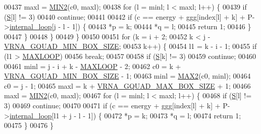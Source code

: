 \begin{DoxyCode}
00437       maxl  = \mbox{\hyperlink{group__utils_gae0b9cd0ce090bd69b951aa73e8fa4f7d}{MIN2}}(c0, maxl);
00438       \textcolor{keywordflow}{for} (l = minl; l < maxl; l++) \{
00439         \textcolor{keywordflow}{if} (\mbox{\hyperlink{group__energy__parameters__rw_gga7bf2bb363bcf5ce50d60255d256e5682af1ce01387d2348f8b858721a7db81670}{S}}[l] != 3)
00440           \textcolor{keywordflow}{continue};
00441 
00442         \textcolor{keywordflow}{if} (c == energy + ggg[index[l] + k] + P->\mbox{\hyperlink{group__energy__parameters_a2a4fb2c65023ec371c9b96573da6d2fc}{internal\_loop}}[j - l - 1]) \{
00443           *p  = k;
00444           *q  = l;
00445           \textcolor{keywordflow}{return} 1;
00446         \}
00447       \}
00448     \}
00449   \}
00450 
00451   \textcolor{keywordflow}{for} (k = i + 2;
00452        k < j - \mbox{\hyperlink{group__energy__parameters_gad7bdd880afca461f97763d79ee57a347}{VRNA\_GQUAD\_MIN\_BOX\_SIZE}};
00453        k++) \{
00454     l1 = k - i - 1;
00455     \textcolor{keywordflow}{if} (l1 > \mbox{\hyperlink{energy__const_8h_ad1bd6eabac419670ddd3c9ed82145988}{MAXLOOP}})
00456       \textcolor{keywordflow}{break};
00457 
00458     \textcolor{keywordflow}{if} (\mbox{\hyperlink{group__energy__parameters__rw_gga7bf2bb363bcf5ce50d60255d256e5682af1ce01387d2348f8b858721a7db81670}{S}}[k] != 3)
00459       \textcolor{keywordflow}{continue};
00460 
00461     minl  = j - i + k - \mbox{\hyperlink{energy__const_8h_ad1bd6eabac419670ddd3c9ed82145988}{MAXLOOP}} - 2;
00462     c0    = k + \mbox{\hyperlink{group__energy__parameters_gad7bdd880afca461f97763d79ee57a347}{VRNA\_GQUAD\_MIN\_BOX\_SIZE}} - 1;
00463     minl  = \mbox{\hyperlink{group__utils_ga33297b3679c713b0c4d897cd0fe3b122}{MAX2}}(c0, minl);
00464     c0    = j - 1;
00465     maxl  = k + \mbox{\hyperlink{group__energy__parameters_ga56cafabad2f8a7db83f2d5d3b0e8d313}{VRNA\_GQUAD\_MAX\_BOX\_SIZE}} + 1;
00466     maxl  = \mbox{\hyperlink{group__utils_gae0b9cd0ce090bd69b951aa73e8fa4f7d}{MIN2}}(c0, maxl);
00467     \textcolor{keywordflow}{for} (l = minl; l < maxl; l++) \{
00468       \textcolor{keywordflow}{if} (\mbox{\hyperlink{group__energy__parameters__rw_gga7bf2bb363bcf5ce50d60255d256e5682af1ce01387d2348f8b858721a7db81670}{S}}[l] != 3)
00469         \textcolor{keywordflow}{continue};
00470 
00471       \textcolor{keywordflow}{if} (c == energy + ggg[index[l] + k] + P->\mbox{\hyperlink{group__energy__parameters_a2a4fb2c65023ec371c9b96573da6d2fc}{internal\_loop}}[l1 + j - l - 1]) \{
00472         *p  = k;
00473         *q  = l;
00474         \textcolor{keywordflow}{return} 1;
00475       \}
00476     \}

\end{DoxyCode}
